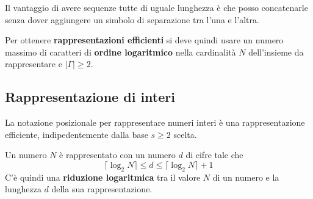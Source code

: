 Il vantaggio di avere sequenze tutte di uguale lunghezza \`e che posso concatenarle senza dover aggiungere un simbolo di
separazione tra l'una e l'altra.

Per ottenere \textbf{rappresentazioni efficienti} si deve quindi usare un numero massimo di caratteri di
\textbf{ordine logaritmico} nella cardinalit\`a $N$ dell'insieme da rappresentare e $| \Gamma | \geq 2$.

\subsection{Rappresentazione di interi}
La notazione posizionale per rappresentare numeri interi \`e una rappresentazione efficiente, indipedentemente dalla base
$s \geq 2$ scelta.

Un numero $N$ \`e rappresentato con un numero $d$ di cifre tale che
\[ \lceil \log_2 N \rceil \leq d \leq \lceil \log_2 N \rceil + 1 \]
C'\`e quindi una \textbf{riduzione logaritmica} tra il valore $N$ di un numero e la lunghezza $d$ della sua
rappresentazione.